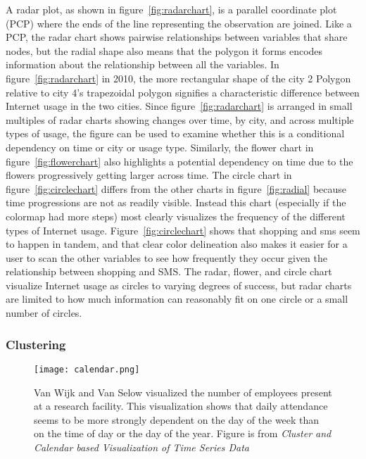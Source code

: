 \documentclass[../main.tex]{subfiles}
\begin{document}
A radar plot, as shown in figure~\ref{fig:radarchart}, is a parallel coordinate plot (PCP) where the ends of the line representing the observation are joined. Like a PCP, the radar chart shows pairwise relationships between variables that share nodes, but the radial shape also means that the polygon it forms encodes information about the relationship between all the variables. In figure~\ref{fig:radarchart} in 2010, the more rectangular shape of the city 2 Polygon relative to city 4's trapezoidal polygon signifies a characteristic difference between Internet usage in the two cities. Since figure~\ref{fig:radarchart} is arranged in small multiples of radar charts showing changes over time, by city, and across multiple types of usage, the figure can be used to examine whether this is a conditional dependency on time or city or usage type. Similarly, the flower chart in figure~\ref{fig:flowerchart} also highlights a potential dependency on time due to the flowers progressively getting larger across time. The circle chart in figure~\ref{fig:circlechart} differs from the other charts in figure~\ref{fig:radial} because time progressions are not as readily visible. Instead this chart (especially if the colormap had more steps) most clearly visualizes the frequency of the different types of Internet usage. Figure~\ref{fig:circlechart} shows that shopping and sms seem to happen in tandem, and that clear color delineation also makes it easier for a user to scan the other variables to see how frequently they occur given the relationship between shopping and SMS. The radar, flower, and circle chart visualize Internet usage as circles to varying degrees of success, but radar charts are limited to how much information can reasonably fit on one circle or a small number of circles. 


\subsubsection{Clustering}

\label{sec:cluster}
\begin{figure}[H]
\texttt{[image: calendar.png]}
\caption{Van Wijk and Van Selow visualized the number of employees present at a research facility. This visualization shows that daily attendance seems to be more strongly dependent on the day of the week than on the time of day or the day of the year. Figure is from \textit{Cluster and Calendar based Visualization of Time Series Data} \cite{van_wijk_cluster_1999}}
\label{fig:calendar}
\end{figure}
\end{document}
